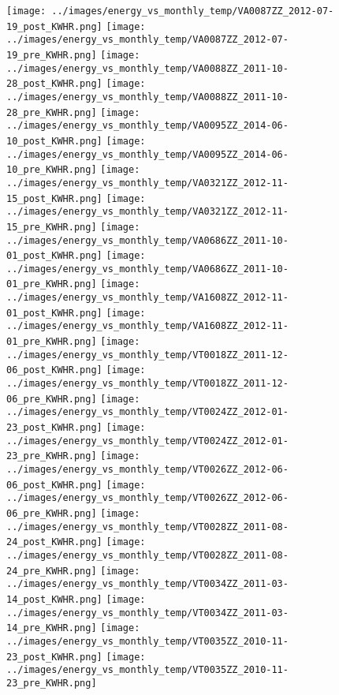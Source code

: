 \clearpage
\begin{figure}
\centering
\texttt{[image: ../images/energy\_vs\_monthly\_temp/VA0087ZZ\_2012-07-19\_post\_KWHR.png]}
\texttt{[image: ../images/energy\_vs\_monthly\_temp/VA0087ZZ\_2012-07-19\_pre\_KWHR.png]}
\texttt{[image: ../images/energy\_vs\_monthly\_temp/VA0088ZZ\_2011-10-28\_post\_KWHR.png]}
\texttt{[image: ../images/energy\_vs\_monthly\_temp/VA0088ZZ\_2011-10-28\_pre\_KWHR.png]}
\texttt{[image: ../images/energy\_vs\_monthly\_temp/VA0095ZZ\_2014-06-10\_post\_KWHR.png]}
\texttt{[image: ../images/energy\_vs\_monthly\_temp/VA0095ZZ\_2014-06-10\_pre\_KWHR.png]}
\texttt{[image: ../images/energy\_vs\_monthly\_temp/VA0321ZZ\_2012-11-15\_post\_KWHR.png]}
\texttt{[image: ../images/energy\_vs\_monthly\_temp/VA0321ZZ\_2012-11-15\_pre\_KWHR.png]}
\texttt{[image: ../images/energy\_vs\_monthly\_temp/VA0686ZZ\_2011-10-01\_post\_KWHR.png]}
\texttt{[image: ../images/energy\_vs\_monthly\_temp/VA0686ZZ\_2011-10-01\_pre\_KWHR.png]}
\texttt{[image: ../images/energy\_vs\_monthly\_temp/VA1608ZZ\_2012-11-01\_post\_KWHR.png]}
\texttt{[image: ../images/energy\_vs\_monthly\_temp/VA1608ZZ\_2012-11-01\_pre\_KWHR.png]}
\texttt{[image: ../images/energy\_vs\_monthly\_temp/VT0018ZZ\_2011-12-06\_post\_KWHR.png]}
\texttt{[image: ../images/energy\_vs\_monthly\_temp/VT0018ZZ\_2011-12-06\_pre\_KWHR.png]}
\texttt{[image: ../images/energy\_vs\_monthly\_temp/VT0024ZZ\_2012-01-23\_post\_KWHR.png]}
\texttt{[image: ../images/energy\_vs\_monthly\_temp/VT0024ZZ\_2012-01-23\_pre\_KWHR.png]}
\texttt{[image: ../images/energy\_vs\_monthly\_temp/VT0026ZZ\_2012-06-06\_post\_KWHR.png]}
\texttt{[image: ../images/energy\_vs\_monthly\_temp/VT0026ZZ\_2012-06-06\_pre\_KWHR.png]}
\texttt{[image: ../images/energy\_vs\_monthly\_temp/VT0028ZZ\_2011-08-24\_post\_KWHR.png]}
\texttt{[image: ../images/energy\_vs\_monthly\_temp/VT0028ZZ\_2011-08-24\_pre\_KWHR.png]}
\texttt{[image: ../images/energy\_vs\_monthly\_temp/VT0034ZZ\_2011-03-14\_post\_KWHR.png]}
\texttt{[image: ../images/energy\_vs\_monthly\_temp/VT0034ZZ\_2011-03-14\_pre\_KWHR.png]}
\texttt{[image: ../images/energy\_vs\_monthly\_temp/VT0035ZZ\_2010-11-23\_post\_KWHR.png]}
\texttt{[image: ../images/energy\_vs\_monthly\_temp/VT0035ZZ\_2010-11-23\_pre\_KWHR.png]}
\end{figure}

